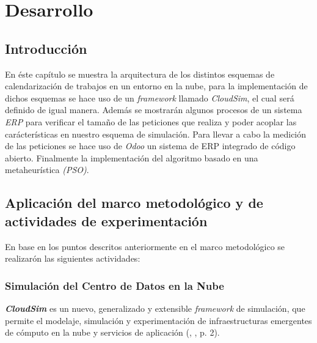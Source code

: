 \chead{}
\rhead{\thepage}



\chapter{Desarrollo}
\section*{Introducci\'on}

En \'este cap\'itulo se muestra la arquitectura de los distintos esquemas de calendarizaci\'on de trabajos en un entorno en la nube, para la implementaci\'on de dichos esquemas se hace uso de un \textit{framework} llamado \textit{CloudSim}, el cual ser\'a definido de igual manera. Además se mostrarán algunos procesos de un sistema \textit{ERP} para verificar el tamaño de las peticiones que realiza y poder acoplar las carácterísticas en nuestro esquema de simulación. Para llevar a cabo la medición de las peticiones se hace uso de \textit{Odoo} un sistema de ERP integrado de código abierto. Finalmente la implementación del algoritmo basado en una metaheurística \textit{(PSO)}.







\newpage
{}
\section{Aplicaci\'on del marco metodol\'ogico y de actividades de experimentaci\'on}

En base en los puntos descritos anteriormente en el marco metodol\'ogico se realizar\'on las siguientes actividades:


\subsection{Simulaci\'on del Centro de Datos en la Nube}

 \textit{\textbf{CloudSim}} es un nuevo, generalizado y extensible \textit{framework} de simulaci\'on, que permite el modelaje, simulaci\'on y experimentaci\'on de infraestructuras emergentes de c\'omputo en la nube y servicios de aplicaci\'on (\citeauthor{calheiros2011cloudsim}, \citeyear{calheiros2011cloudsim}, p. 2).


